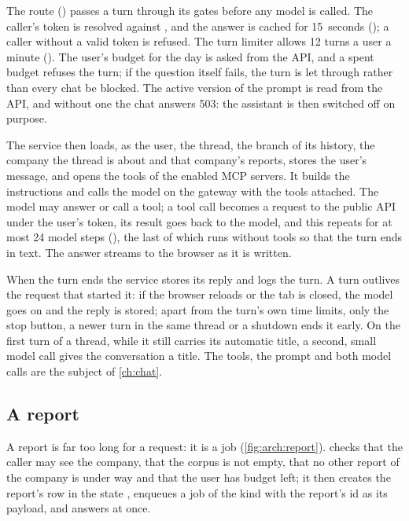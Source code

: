 The route () passes a turn through its gates before any model is called.
The caller's token is resolved against , and the answer is cached
for 15~seconds (); a caller without a valid token is refused. The
turn limiter allows 12 turns a user a minute (). The user's budget for
the day is asked from the API, and a spent budget refuses the turn; if the question itself
fails, the turn is let through rather than every chat be blocked. The active version of the
prompt  is read from the API, and without one the chat answers 503:
the assistant is then switched off on purpose.

The service then loads, as the user, the thread, the branch of its history, the company the
thread is about and that company's reports, stores the user's message, and opens the tools of
the enabled MCP servers. It builds the instructions and calls the model on the gateway with
the tools attached. The model may answer or call a tool; a tool call becomes a request to the
public API under the user's token, its result goes back to the model, and this repeats for at
most 24 model steps (), the last of which runs without tools so that the turn
ends in text. The answer streams to the browser as it is written.

When the turn ends the service stores its reply and logs the turn. A turn outlives the
request that started it: if the browser reloads or the tab is closed, the model goes on and
the reply is stored; apart from the turn's own time limits, only the stop button, a newer
turn in the same thread or a shutdown ends it early. On the first turn of a thread, while it
still carries its automatic title, a second, small model call gives the conversation a
title. The tools, the prompt and both model calls are the subject of \cref{ch:chat}.

\subsection{A report}

A report is far too long for a request: it is a job (\cref{fig:arch:report}).
 checks that the caller may see the company, that the corpus is not
empty, that no other report of the company is under way and that the user has budget left;
it then creates the report's row in the state , enqueues a job of the kind
 with the report's id as its payload, and answers at once.

